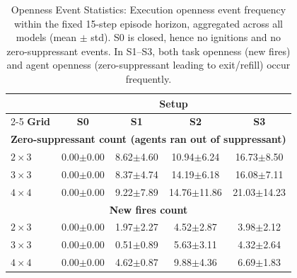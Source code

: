 \begin{table} [h]
\centering
\small
\setlength{\tabcolsep}{3pt}
\renewcommand{\arraystretch}{1.05}
\begin{tabular}{l|c|c|c|c}
\toprule
 & \multicolumn{4}{c}{\textbf{Setup}} \\
\cline{2-5}
\textbf{Grid} & \multicolumn{1}{c|}{\textbf{S0}} & \multicolumn{1}{c|}{\textbf{S1}} & \multicolumn{1}{c|}{\textbf{S2}} & \multicolumn{1}{c}{\textbf{S3}} \\
\midrule
\multicolumn{5}{c}{\textbf{Zero-suppressant count (agents ran out of suppressant)}} \\
\midrule
$2\times 3$ & 0.00$\pm$0.00 & 8.62$\pm$4.60 & 10.94$\pm$6.24 & 16.73$\pm$8.50 \\
$3\times 3$ & 0.00$\pm$0.00 & 8.37$\pm$4.74 & 14.19$\pm$6.18 & 16.08$\pm$7.11 \\
$4\times 4$ & 0.00$\pm$0.00 & 9.22$\pm$7.89 & 14.76$\pm$11.86 & 21.03$\pm$14.23 \\
\midrule
\multicolumn{5}{c}{\textbf{New fires count}} \\
\midrule
$2\times 3$ & 0.00$\pm$0.00 & 1.97$\pm$2.27 & 4.52$\pm$2.87 & 3.98$\pm$2.12 \\
$3\times 3$ & 0.00$\pm$0.00 & 0.51$\pm$0.89 & 5.63$\pm$3.11 & 4.32$\pm$2.64 \\
$4\times 4$ & 0.00$\pm$0.00 & 4.62$\pm$0.87 & 9.88$\pm$4.36 & 6.69$\pm$1.83 \\
\bottomrule
\end{tabular}
\caption{Openness Event Statistics: Execution openness event frequency within the fixed 15-step episode horizon, aggregated across all models (mean $\pm$ std). S0 is closed, hence no ignitions and no zero-suppressant events. In S1--S3, both task openness (new fires) and agent openness (zero-suppressant leading to exit/refill) occur frequently.}
\label{tab:openness_events}
\end{table}


